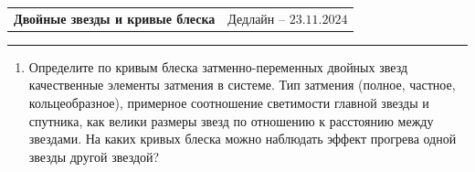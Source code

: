 \documentclass[12pt]{article}
\begin{document}
 \begin{tabularx}{\textwidth}{Xr}
  {\Large \textbf{Двойные звезды и кривые блеска}} & Дедлайн -- $23.11.2024$ \\
 \end{tabularx}
 \noindent\rule{\textwidth}{0.4pt}
 \begin{enumerate}
       \item Определите по кривым блеска затменно-переменных двойных звезд качественные элементы затмения в системе. Тип затмения (полное, частное, кольцеобразное), примерное соотношение светимости главной звезды и спутника, как велики размеры звезд по отношению к расстоянию между звездами. На каких кривых блеска можно наблюдать эффект прогрева одной звезды другой звездой?
       \begin{figure}[h]
       \end{figure}


\end{enumerate}
\end{document}
